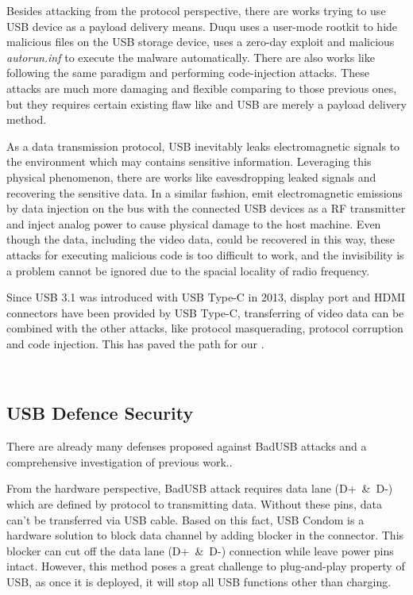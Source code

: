 Besides attacking from the protocol perspective, there are works trying to use USB device as a payload delivery means. Duqu\cite{duqu} uses a user-mode rootkit to hide malicious files on the USB storage device, \cite{flame} uses a zero-day exploit and malicious \textit{autorun.inf} to execute the malware automatically. There are also works like \cite{brain, stuxnet, conficker} following the same paradigm and performing code-injection attacks. These attacks are much more damaging and flexible comparing to those previous ones, but they requires certain existing flaw like \cite{zero-day} and USB are merely a payload delivery method.

As a data transmission protocol, USB inevitably leaks electromagnetic signals to the environment which may contains sensitive information. Leveraging this physical phenomenon, there are works like \cite{smartphone, poweremi,revealing,su2017usb, usbgpslocator, bates2014leveraging, badusbhub, usbfinger, side, usbdriver} eavesdropping leaked signals and recovering the sensitive data. In a similar fashion, \cite{usbee, turnip} emit electromagnetic emissions by data injection on the bus with the connected USB devices as a RF transmitter and \cite{usbkiller, cable} inject analog power to cause physical damage to the host machine. Even though the data, including the video data, could be recovered in this way, these attacks for executing malicious code is too difficult to work, and the invisibility is a problem cannot be ignored due to the spacial locality of radio frequency.

Since USB 3.1 was introduced with USB Type-C in 2013, display port and HDMI connectors have been provided by USB Type-C, transferring of video data can be combined with the other attacks, like protocol masquerading,  protocol corruption and code injection. This has paved the path for our \tool.




\\


\subsection{USB Defence Security}
\label{subsec:usb_defence}
There are already many defenses proposed against BadUSB attacks and a comprehensive investigation of previous work.\cite{sok}.

From the hardware perspective, BadUSB attack requires data lane \mbox{(D+ \& D-)} which are defined by protocol to transmitting data.
Without these pins, data can't be transferred via USB cable. Based on this fact, USB Condom \cite{Condom} is a hardware solution to block data channel by adding blocker in the connector. This blocker can cut off the data lane \mbox{(D+ \& D-)} connection while leave power pins intact.
However, this method poses a great challenge to plug-and-play property of USB, as once it is deployed, it will stop all USB functions other than charging.

